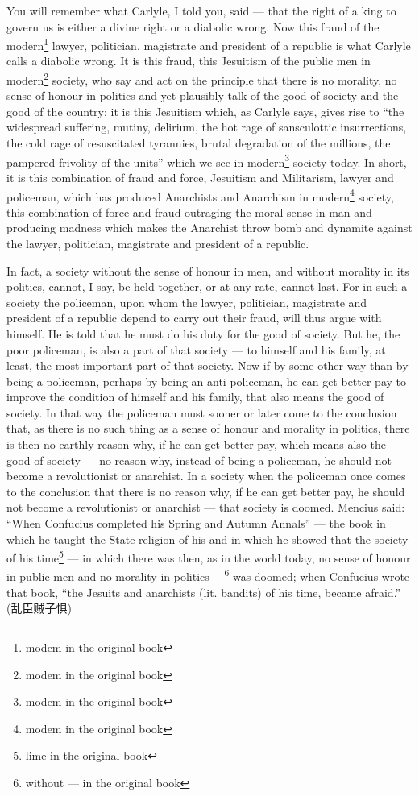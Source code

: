 You will remember what Carlyle, I told you, said --- that the right of a king to govern us is either a divine right or a diabolic wrong.
Now this fraud of the modern\footnote{modem in the original book} lawyer, politician, magistrate and president of a republic is what Carlyle calls a diabolic wrong.
It is this fraud, this Jesuitism  of the public men in modern\footnote{modem in the original book} society, who say and act on the principle that there is no morality, no sense of honour in politics and yet plausibly talk of the good of society and the good of the country; it is this Jesuitism which, as Carlyle says, gives rise to ``the widespread suffering, mutiny, delirium, the hot rage of sansculottic insurrections, the cold rage of resuscitated tyrannies, brutal degradation of the millions, the pampered frivolity of the units'' which we see in modern\footnote{modem in the original book} society today.
In short, it is this combination of fraud and force, Jesuitism and Militarism, lawyer and policeman, which has produced Anarchists and Anarchism in modern\footnote{modem in the original book} society, this combination of force and fraud outraging the moral sense in man and producing madness which makes the Anarchist throw bomb and dynamite against the lawyer, politician, magistrate and president of a republic.

In fact, a society without the sense of honour in men, and without morality in its politics, cannot, I say, be held together, or at any rate, cannot last.
For in such a society the policeman, upon whom the lawyer, politician, magistrate and president of a republic depend to carry out their fraud, will thus argue with himself.
He is told that he must do his duty for the good of society.
But he, the poor policeman, is also a part of that society --- to himself and his family, at least, the most important part of that society.
Now if by some other way than by being a policeman, perhaps by being an anti-policeman, he can get better pay to improve the condition of himself and his family, that also means the good of society.
In that way the policeman must sooner or later come to the conclusion that, as there is no such thing as a sense of honour and morality in politics, there is then no earthly reason why, if he can get better pay, which means also the good of society --- no reason why, instead of being a policeman, he should not become a revolutionist or anarchist.
In a society when the policeman once comes to the conclusion that there is no reason why, if he can get better pay, he should not become a revolutionist or anarchist --- that society is doomed.
Mencius said: ``When Confucius completed his Spring and Autumn Annals'' --- the book in which he taught the State religion of his and in which he showed that the society of his time\footnote{lime in the original book} --- in which there was then, as in the world today, no sense of honour in public men and no morality in politics ---\footnote{without --- in the original book} was doomed; when Confucius wrote that book, ``the Jesuits and anarchists (lit. bandits) of his time, became afraid.'' (乱臣贼子惧)\cite{num14}

